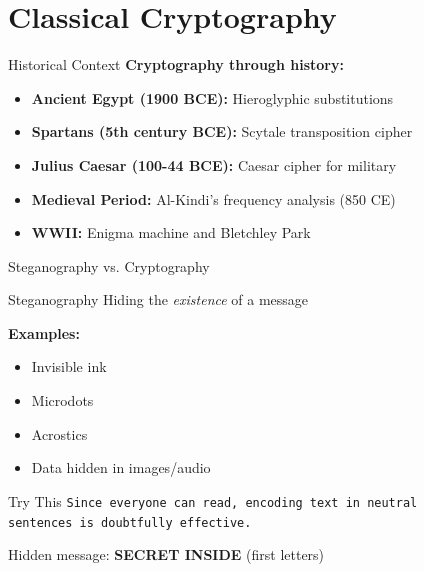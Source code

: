 \documentclass{beamer}
\begin{document}

\section{Classical Cryptography}

\begin{frame}{Historical Context}
\textbf{Cryptography through history:}

\begin{itemize}
    \item \textbf{Ancient Egypt (1900 BCE):} Hieroglyphic substitutions
    \item \textbf{Spartans (5th century BCE):} Scytale transposition cipher
    \item \textbf{Julius Caesar (100-44 BCE):} Caesar cipher for military
    \item \textbf{Medieval Period:} Al-Kindi's frequency analysis (850 CE)
    \item \textbf{WWII:} Enigma machine and Bletchley Park
\end{itemize}

\end{frame}

\begin{frame}{Steganography vs. Cryptography}
\begin{block}{Steganography}
Hiding the \emph{existence} of a message
\end{block}

\textbf{Examples:}
\begin{itemize}
    \item Invisible ink
    \item Microdots
    \item Acrostics
    \item Data hidden in images/audio
\end{itemize}
\pause
\vspace{0.3cm}
\begin{exampleblock}{Try This}
\texttt{Since everyone can read, encoding text in neutral\\
sentences is doubtfully effective.}
\end{exampleblock}\pause

Hidden message: \textbf{SECRET INSIDE} (first letters)

\end{frame}
\end{document}
